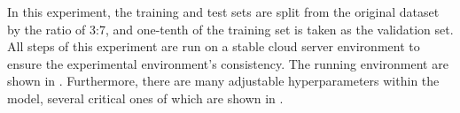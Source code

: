 In this experiment, the training and test sets are split from the original dataset by the ratio of 3:7, and one-tenth of the training set is taken as the validation set. All steps of this experiment are run on a stable cloud server environment to ensure the experimental environment's consistency. The running environment are shown in \tblname{{\ref{tbl:ch2-exp-env}}}. Furthermore, there are many adjustable hyperparameters within the model, several critical ones of which are shown in \tblname{\ref{tbl:ch2-hpsetting}}.



